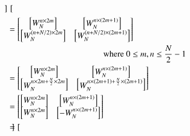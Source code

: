 \documentclass[journal,12pt,twocolumn]{IEEEtran}
\renewcommand\thesection{\arabic{section}}
\begin{document}
\begin{enumerate}[label=\arabic*.,ref=\thesection.\theenumi]
\begin{align}
\begin{bmatrix}
	\end{bmatrix}\\
&=\begin{bmatrix}
	\begin{bmatrix}
		W_N^{n\times 2m}
	\end{bmatrix}&\begin{bmatrix}
	W_N^{n\times (2m+1)}
\end{bmatrix}\\
%	
\begin{bmatrix}
	W_N^{(n+N/2)\times 2m}
\end{bmatrix}&
\begin{bmatrix}
	W_N^{(n+N/2)\times (2m+1)}
\end{bmatrix}	
\end{bmatrix}\\
&\hspace{40mm}\text{where } 0 \le m,n \le \frac{N}{2}-1  \nonumber\\
&=\begin{bmatrix}
	\begin{bmatrix}
		W_N^{n\times 2m}
	\end{bmatrix}&\begin{bmatrix}
	W_N^{n\times (2m+1)}
\end{bmatrix}\\
	\begin{bmatrix}
		W_N^{n\times 2m+\frac{N}{2}\times 2m}
	\end{bmatrix}&\begin{bmatrix}
	W_N^{n\times (2m+1)+\frac{N}{2}\times (2m+1)}
\end{bmatrix}
\end{bmatrix}\\
&=\begin{bmatrix}
	\begin{bmatrix}
		W_N^{n\times 2m}
	\end{bmatrix}&
\begin{bmatrix}
	W_N^{n\times (2m+1)}
\end{bmatrix}\\
	\begin{bmatrix}
		W_N^{n\times 2m}
	\end{bmatrix}&
\begin{bmatrix}
	-W_N^{n\times (2m+1)}
\end{bmatrix}
\end{bmatrix}\\
&=\begin{bmatrix}

\end{bmatrix}
\end{align}
\end{enumerate}
\end{document}
